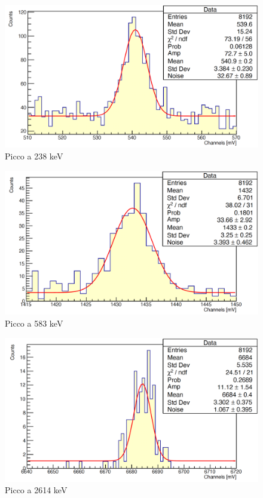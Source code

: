\documentclass[a4paper,10pt]{article}
\begin{document}
\begin{figure}[H]
    \centering
    \includegraphics[scale=0.45]{appendice/spettri/ThA1_8}
    \caption{Picco a 238 keV}
\end{figure}
\begin{figure}[H]
    \centering
    \includegraphics[scale=0.45]{appendice/spettri/ThA2_8}
    \caption{Picco a 583 keV}
\end{figure}
\begin{figure}[H]
    \centering
    \includegraphics[scale=0.45]{appendice/spettri/ThA3_8}
    \caption{Picco a 2614 keV}
\end{figure}
\end{document}
